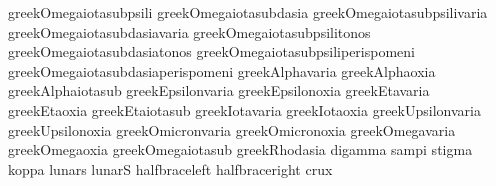  greekOmegaiotasubpsili            {\psili \greekOmega \greekiota}
 greekOmegaiotasubdasia            {\dasia \greekOmega \greekiota}
 greekOmegaiotasubpsilivaria       {\greekpsilivaria \greekOmega \greekiota}
 greekOmegaiotasubdasiavaria       {\greekdasiavaria \greekOmega \greekiota}
 greekOmegaiotasubpsilitonos       {\greekpsilitonos \greekOmega \greekiota}
 greekOmegaiotasubdasiatonos       {\greekdasiatonos \greekOmega \greekiota}
 greekOmegaiotasubpsiliperispomeni {\greekpsiliperispomeni \greekOmega \greekiota}
 greekOmegaiotasubdasiaperispomeni {\greekdasiaperispomeni \greekOmega \greekiota}
 greekAlphavaria                   {\varia \greekAlpha}
 greekAlphaoxia                    {\oxia \greekAlpha}
 greekAlphaiotasub                 {\greekAlpha \greekiota}
 greekEpsilonvaria                 {\varia \greekEpsilon}
 greekEpsilonoxia                  {\oxia \greekEpsilon}
 greekEtavaria                     {\varia \greekEta}
 greekEtaoxia                      {\oxia \greekEta}
 greekEtaiotasub                   {\greekEta \greekiota}
 greekIotavaria                    {\varia \greekIota}
 greekIotaoxia                     {\oxia \greekIota}
 greekUpsilonvaria                 {\varia \greekUpsilon}
 greekUpsilonoxia                  {\oxia \greekUpsilon}
 greekOmicronvaria                 {\varia \greekOmicron}
 greekOmicronoxia                  {\oxia \greekOmicron}
 greekOmegavaria                   {\varia \greekOmega}
 greekOmegaoxia                    {\oxia \greekOmega}
 greekOmegaiotasub                 {\greekOmega \greekiota}
 greekRhodasia                     {\dasia \greekRho}
 digamma                           {\greekdigamma}
 sampi                             {\greeksampi}
 stigma                            {\greekstigma}
 koppa                             {\greeknumkoppa}
 lunars                            {\greeksigmalunate}
 lunarS                            {\greekSigmalunate}
 halfbraceleft                     {\floorleft}
 halfbraceright                    {\floorright}
 crux                              {\textdag}

\stopencoding

\endinput
